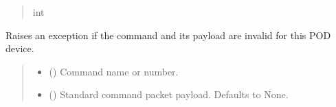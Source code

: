 \documentclass[letterpaper,10pt,english]{sphinxmanual}
\begin{document}
\begin{fulllineitems}
\begin{fulllineitems}
\begin{quote}
\begin{description}
\sphinxAtStartPar
int

\end{description}\end{quote}

\end{fulllineitems}


\begin{fulllineitems}
\label{\detokenize{PodApi.Commands:PodApi.Commands.PodCommands.CommandSet.ValidateCommand}}
\pysigstartsignatures
{}
\pysigstopsignatures
\sphinxAtStartPar
Raises an exception if the command and its payload are invalid for this POD device.
\begin{quote}\begin{description}
\begin{itemize}
\item {} 
\sphinxAtStartPar
{} (\sphinxstyleliteralemphasis{\sphinxupquote{ | }}) \textendash{} Command name or number.

\item {} 
\sphinxAtStartPar
{} (\sphinxstyleliteralemphasis{\sphinxupquote{ | }}\sphinxstyleliteralemphasis{\sphinxupquote{ | }}\sphinxstyleliteralemphasis{\sphinxupquote{{[}}}\sphinxstyleliteralemphasis{\sphinxupquote{ | }}\sphinxstyleliteralemphasis{\sphinxupquote{{]} }}\sphinxstyleliteralemphasis{\sphinxupquote{| }}\sphinxstyleliteralemphasis{\sphinxupquote{, }}) \textendash{} Standard command packet payload. Defaults to None.


\end{itemize}
\end{description}
\end{quote}
\end{fulllineitems}
\end{fulllineitems}
\end{document}
